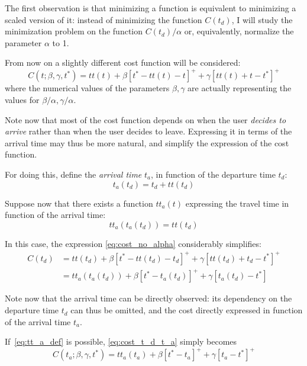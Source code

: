 The first observation is that minimizing a function is equivalent to minimizing a scaled version of it:
instead of minimizing the function \(C(t_d)\),
I will study the minimization problem on the function \(C(t_d)/\alpha\) or,
equivalently, normalize the parameter \(\alpha\) to 1.

From now on a slightly different cost function will be considered:
\begin{equation}
  \label{eq:cost_no_alpha}
  C(t; \beta, \gamma, t^*) = tt(t) + \beta [t^* - tt(t) - t]^+ + \gamma[tt(t) + t - t^*]^+
\end{equation}
where the numerical values of the parameters \(\beta, \gamma\) are actually representing the values for \(\beta/\alpha, \gamma/\alpha\).

Note now that most of the cost function depends on when the user \textit{decides to arrive} rather than when the user decides to leave.
Expressing it in terms of the arrival time may thus be more natural,
and simplify the expression of the cost function.

For doing this, define the \textit{arrival time} \(t_a\), in function of the departure time \(t_d\):
\[t_a(t_d) = t_d + tt(t_d)\]

Suppose now that there exists a function \(tt_a(t)\) expressing the travel time in function of the arrival time:
\begin{equation}
  \label{eq:tt_a_def}
  tt_a(t_a(t_d)) = tt(t_d)
\end{equation}

In this case, the expression \eqref{eq:cost_no_alpha} considerably simplifies:
\begin{equation}
  \label{eq:cost_t_d_t_a}
  \begin{split}
    C(t_d) & = tt(t_d) + \beta [t^* - tt(t_d) - t_d]^+ + \gamma[tt(t_d) + t_d - t^*]^+ \\
           & = tt_a(t_a(t_d)) + \beta [t^* - t_a(t_d)]^+ + \gamma [t_a(t_d) - t^*]
  \end{split}
\end{equation}

Note now that the arrival time can be directly observed:
its dependency on the departure time \(t_d\) can thus be omitted,
and the cost directly expressed in function of the arrival time \(t_a\).

If~\eqref{eq:tt_a_def} is possible, \eqref{eq:cost_t_d_t_a} simply becomes
\begin{equation}
  \label{eq:cost_simplified}
  C(t_a; \beta, \gamma, t^*) = tt_a(t_a) + \beta [t^* - t_a]^+ + \gamma [t_a - t^*]^+
\end{equation}

